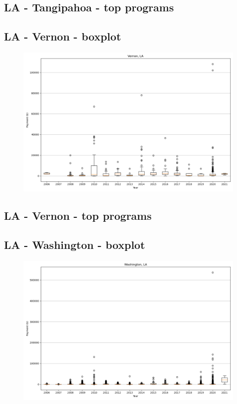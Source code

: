 \subsection*{LA - Tangipahoa - top programs}

\newpage
\subsection*{LA - Vernon - boxplot}
\begin{figure}[h]
\centering
\includegraphics[width=7in]{../output/boxplots/counties/Vernon-LA_boxplot.png}
\end{figure}


\subsection*{LA - Vernon - top programs}

\newpage
\subsection*{LA - Washington - boxplot}
\begin{figure}[h]
\centering
\includegraphics[width=7in]{../output/boxplots/counties/Washington-LA_boxplot.png}
\end{figure}


